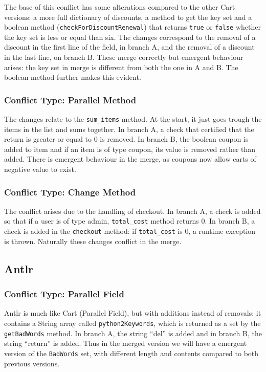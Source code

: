 The base of this conflict has some alterations compared to the other Cart versions: a more full dictionary of discounts,
a method to get the key set and a boolean method (\texttt{checkForDiscountRenewal}) that returns \texttt{true} or \texttt{false} whether the key set is less or equal than six.
The changes correspond to the removal of a discount in the first line of the field, in branch A, and the removal of a discount in the last line, on branch B.
These merge correctly but emergent behaviour arises: the key set in merge is different from both the one in A and B.
The boolean method further makes this evident.

\subsubsection{Conflict Type: Parallel Method}

The changes relate to the \texttt{sum\_items} method. At the start, it just goes trough the items in the list and sums together. In branch A,
a check that certified that the return is greater or equal to 0 is removed. In branch B, the boolean coupon is added to item and if an item
is of type coupon, its value is removed rather than added. There is emergent behaviour in the merge, as coupons now allow carts of negative
value to exist.

\subsubsection{Conflict Type: Change Method}

The conflict arises due to the handling of checkout. In branch A, a check is added so that if a user is of type admin,
\texttt{total\_cost} method returns 0. In branch B, a check is added in the \texttt{checkout} method: if \texttt{total\_cost} is 0, a runtime exception is thrown.
Naturally these changes conflict in the merge.

\subsection{Antlr}

\subsubsection{Conflict Type: Parallel Field}

Antlr is much like Cart (Parallel Field), but with additions instead of removals: it contains a String array called \texttt{python2Keywords}, which is returned as a set by the \texttt{getBadWords} method.
In branch A, the string ``del'' is added and in branch B, the string ``return'' is added.
Thus in the merged version we will have a emergent version of the \texttt{BadWords}
set, with different length and contents compared to both previous versions.

